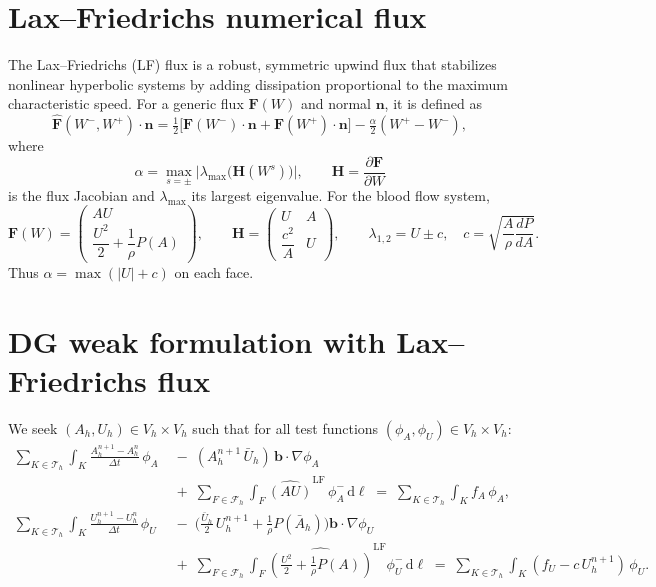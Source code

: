 \documentclass[11pt]{article}
\newcommand{\dt}{\Delta t}
\newcommand{\Vh}{V_h}
\newcommand{\Th}{\mathcal{T}_h}
\newcommand{\Fh}{\mathcal{F}_h}
\begin{document}
\section{Lax--Friedrichs numerical flux}
The Lax--Friedrichs (LF) flux is a robust, symmetric upwind flux that
stabilizes nonlinear hyperbolic systems by adding dissipation proportional to the
maximum characteristic speed.  
For a generic flux $\mathbf{F}(W)$ and normal $\bm n$, it is defined as
\begin{equation}
  \widehat{\mathbf{F}}(W^-,W^+) \cdot \bm n
  = \tfrac12 \big[ \mathbf{F}(W^-)\cdot\bm n + \mathbf{F}(W^+)\cdot\bm n \big]
    - \tfrac{\alpha}{2}(W^+ - W^-),
  \label{eq:laxfriedrichs-flux}
\end{equation}
where
\[
  \alpha = \max_{s=\pm}\big|\lambda_{\max}\big(\mathbf{H}(W^s)\big)\big|,
  \qquad
  \mathbf{H} = \frac{\partial \mathbf{F}}{\partial W}
\]
is the flux Jacobian and $\lambda_{\max}$ its largest eigenvalue.
For the blood flow system,
\[
  \mathbf{F}(W) =
  \begin{pmatrix}
    A U \\[2mm]
    \dfrac{U^2}{2} + \dfrac{1}{\rho}P(A)
  \end{pmatrix}, \qquad
  \mathbf{H} =
  \begin{pmatrix}
    U & A \\[1mm]
    \dfrac{c^2}{A} & U
  \end{pmatrix}, \qquad
  \lambda_{1,2} = U \pm c, \quad
  c=\sqrt{\dfrac{A}{\rho}\dfrac{dP}{dA}}.
\]
Thus $\alpha = \max(|U|+c)$ on each face.

\section{DG weak formulation with Lax--Friedrichs flux}

We seek $(A_h,U_h)\in\Vh\times\Vh$ such that for all test functions
$(\phi_A,\phi_U)\in\Vh\times\Vh$:
\begin{align}
\sum_{K\in\Th}\!\!\int_K
  \frac{A_h^{n+1}-A_h^n}{\dt}\,\phi_A
&\;-\;
  (A_h^{n+1}\,\bar U_h)\,\bm b\!\cdot\!\nabla\phi_A
\nonumber\\
&\;+\;
  \sum_{F\in\Fh}\!\!\int_F
  \widehat{(A U)}^{\text{LF}}\,\phi_A^-\,\mathrm d\ell
\;=\;
  \sum_{K\in\Th}\!\!\int_K f_A\,\phi_A ,
\label{eq:area-dg-lf}
\\[8pt]
\sum_{K\in\Th}\!\!\int_K
  \frac{U_h^{n+1}-U_h^n}{\dt}\,\phi_U
&\;-\;
  \Big(
    \tfrac{\bar U_h}{2}\,U_h^{n+1}
    + \tfrac{1}{\rho}P(\bar A_h)
  \Big)
  \bm b\!\cdot\!\nabla\phi_U
\nonumber\\
&\;+\;
  \sum_{F\in\Fh}\!\!\int_F
  \widehat{\!\left(
    \tfrac{U^2}{2}
    + \tfrac{1}{\rho}P(A)
  \right)\!}^{\text{LF}}
  \phi_U^-\,\mathrm d\ell
\;=\;
  \sum_{K\in\Th}\!\!\int_K
  (f_U - c\,U_h^{n+1})\,\phi_U .
\label{eq:momentum-dg-lf}
\end{align}
\end{document}
